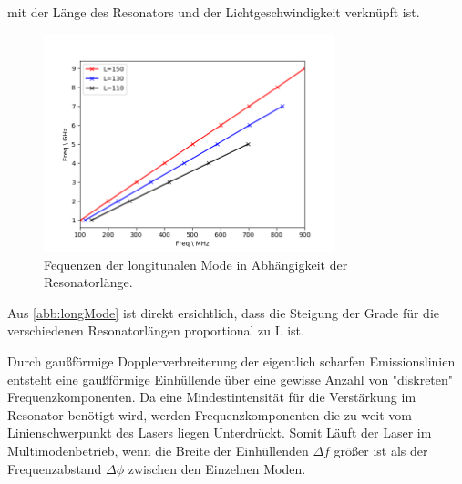 mit der Länge des Resonators und der Lichtgeschwindigkeit verknüpft ist.

\begin{figure}[!h]
  \centering
  \includegraphics[width=0.75\textwidth]{img/longMode.png}
  \caption{Fequenzen der longitunalen Mode in Abhängigkeit der Resonatorlänge.}
  \label{abb:longMode}
\end{figure}

Aus \autoref{abb:longMode} ist direkt ersichtlich, dass die Steigung der Grade für die verschiedenen
Resonatorlängen proportional zu L ist.

Durch gaußförmige Dopplerverbreiterung der eigentlich scharfen Emissionslinien entsteht eine gaußförmige
Einhüllende über eine gewisse Anzahl von "diskreten" Frequenzkomponenten. Da eine Mindestintensität
für die Verstärkung im Resonator benötigt wird, werden Frequenzkomponenten die 
zu weit vom Linienschwerpunkt des Lasers liegen Unterdrückt.
Somit Läuft der Laser im Multimodenbetrieb, wenn die Breite der Einhüllenden $\Delta f$ größer ist als
der Frequenzabstand $\Delta \phi$ zwischen den Einzelnen Moden.



